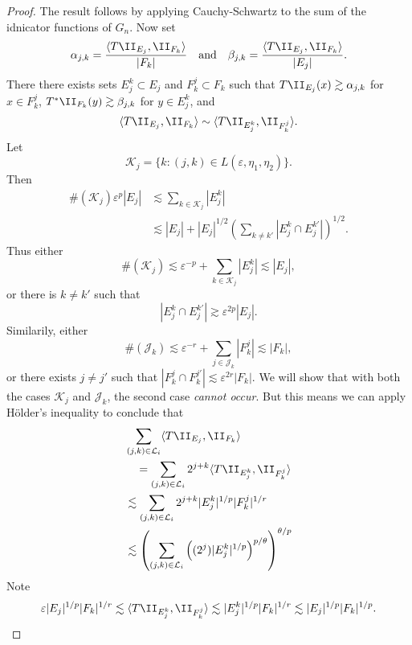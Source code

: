 \begin{proof}
    The result follows by applying Cauchy-Schwartz to the sum of the idnicator functions of $G_n$. Now set
    \[ \alpha_{j,k} = \frac{\langle T\II_{E_j}, \II_{F_k} \rangle}{|F_k|} \quad\text{and}\quad \beta_{j,k} = \frac{\langle T \II_{E_j}, \II_{F_k} \rangle}{|E_j|}. \]
    There there exists sets $E_j^k \subset E_j$ and $F_k^j \subset F_k$ such that $T \II_{E_j}(x) \gtrsim \alpha_{j,k}$ for $x \in F_k^j$, $T^* \II_{F_k}(y) \gtrsim \beta_{j,k}$ for $y \in E_j^k$, and
    \[ \langle T \II_{E_j}, \II_{F_k} \rangle \sim \langle T \II_{E_j^k}, \II_{F^j_k} \rangle. \]
    Let
    \[ \mathcal{K}_j = \{ k : (j,k) \in L(\varepsilon,\eta_1,\eta_2) \}. \]
    Then
    \begin{align*}
        \#(\mathcal{K}_j) \varepsilon^p |E_j| &\lesssim \sum_{k \in \mathcal{K}_j} |E_j^k|\\
        &\lesssim |E_j| + |E_j|^{1/2} \left( \sum_{k \neq k'} |E_j^k \cap E_j^{k'}| \right)^{1/2}.
    \end{align*}
    Thus either
    \[ \#(\mathcal{K}_j) \lesssim \varepsilon^{-p} + \sum_{k \in \mathcal{K}_j} |E_j^k| \lesssim |E_j|, \]
    or there is $k \neq k'$ such that
    \[ |E_j^k \cap E_j^{k'}| \gtrsim \varepsilon^{2p} |E_j|. \]
    Similarily, either
    \[ \#(\mathcal{J}_k) \lesssim \varepsilon^{-r} + \sum_{j \in \mathcal{J}_k} |F_k^j| \lesssim |F_k|, \]
    or there exists $j \neq j'$ such that $|F_k^j \cap F_k^{j'}| \lesssim \varepsilon^{2r} |F_k|$. We will show that with both the cases $\mathcal{K}_j$ and $\mathcal{J}_k$, the second case \emph{cannot occur}. But this means we can apply H\"{o}lder's inequality to conclude that
    \begin{align*}
        &\sum_{(j,k) \in \mathcal{L}_i} \langle T \II_{E_j}, \II_{F_k} \rangle\\
        &\quad =\sum_{(j,k) \in \mathcal{L}_i} 2^{j+k} \langle T \II_{E_j^k}, \II_{F^j_k} \rangle\\
        &\lesssim \sum_{(j,k) \in \mathcal{L}_i} 2^{j+k} |E_j^k|^{1/p} |F_k^j|^{1/r}\\
        &\lesssim \left( \sum_{(j,k) \in \mathcal{L}_i} \left( (2^j) |E_j^k|^{1/p} \right)^{p/\theta} \right)^{\theta/p}    
    \end{align*}
    Note
    \[ \varepsilon |E_j|^{1/p} |F_k|^{1/r} \lesssim \langle T \II_{E_j^k}, \II_{F^j_k} \rangle \lesssim |E_j^k|^{1/p} |F_k|^{1/r} \lesssim |E_j|^{1/p} |F_k|^{1/p}. \]

\end{proof}
